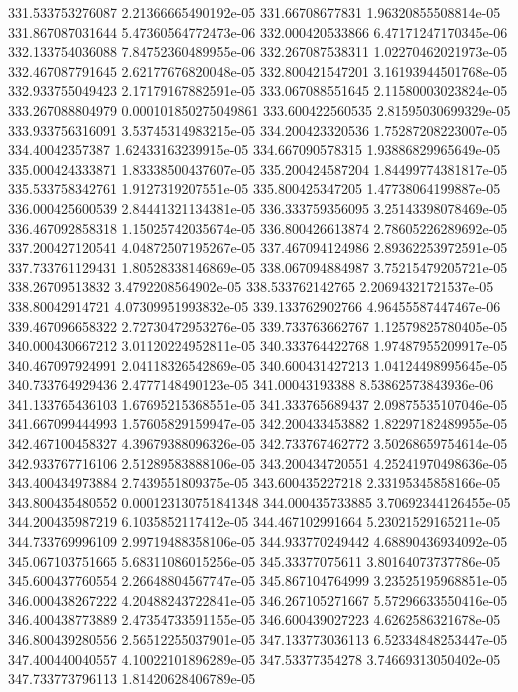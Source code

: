 {331.533753276087 2.21366665490192e-05
331.66708677831 1.96320855508814e-05
331.867087031644 5.47360564772473e-06
332.000420533866 6.47171247170345e-06
332.133754036088 7.84752360489955e-06
332.267087538311 1.02270462021973e-05
332.467087791645 2.62177676820048e-05
332.800421547201 3.16193944501768e-05
332.933755049423 2.17179167882591e-05
333.067088551645 2.11580003023824e-05
333.267088804979 0.000101850275049861
333.600422560535 2.81595030699329e-05
333.933756316091 3.53745314983215e-05
334.200423320536 1.75287208223007e-05
334.40042357387 1.62433163239915e-05
334.667090578315 1.93886829965649e-05
335.000424333871 1.83338500437607e-05
335.200424587204 1.84499774381817e-05
335.533758342761 1.9127319207551e-05
335.800425347205 1.47738064199887e-05
336.000425600539 2.84441321134381e-05
336.333759356095 3.25143398078469e-05
336.467092858318 1.15025742035674e-05
336.800426613874 2.78605226289692e-05
337.200427120541 4.04872507195267e-05
337.467094124986 2.89362253972591e-05
337.733761129431 1.80528338146869e-05
338.067094884987 3.75215479205721e-05
338.26709513832 3.4792208564902e-05
338.533762142765 2.20694321721537e-05
338.80042914721 4.07309951993832e-05
339.133762902766 4.96455587447467e-06
339.467096658322 2.72730472953276e-05
339.733763662767 1.12579825780405e-05
340.000430667212 3.01120224952811e-05
340.333764422768 1.97487955209917e-05
340.467097924991 2.04118326542869e-05
340.600431427213 1.04124498995645e-05
340.733764929436 2.4777148490123e-05
341.00043193388 8.53862573843936e-06
341.133765436103 1.67695215368551e-05
341.333765689437 2.09875535107046e-05
341.667099444993 1.57605829159947e-05
342.200433453882 1.82297182489955e-05
342.467100458327 4.39679388096326e-05
342.733767462772 3.50268659754614e-05
342.933767716106 2.51289583888106e-05
343.200434720551 4.25241970498636e-05
343.400434973884 2.7439551809375e-05
343.600435227218 2.33195345858166e-05
343.800435480552 0.000123130751841348
344.000435733885 3.70692344126455e-05
344.200435987219 6.1035852117412e-05
344.467102991664 5.23021529165211e-05
344.733769996109 2.99719488358106e-05
344.933770249442 4.68890436934092e-05
345.067103751665 5.68311086015256e-05
345.33377075611 3.80164073737786e-05
345.600437760554 2.26648804567747e-05
345.867104764999 3.23525195968851e-05
346.000438267222 4.20488243722841e-05
346.267105271667 5.57296633550416e-05
346.400438773889 2.47354733591155e-05
346.600439027223 4.6262586321678e-05
346.800439280556 2.56512255037901e-05
347.133773036113 6.52334848253447e-05
347.400440040557 4.10022101896289e-05
347.53377354278 3.74669313050402e-05
347.733773796113 1.81420628406789e-05
}
